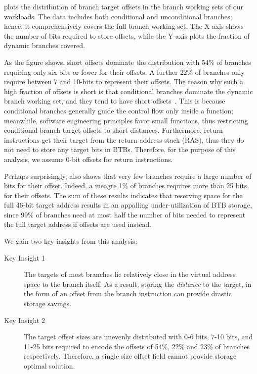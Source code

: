  plots the distribution of branch target offsets in the branch working sets of our workloads. The data includes both conditional and unconditional branches; hence, it comprehensively covers the full branch working set. The X-axis shows the number of bits required to store offsets, while the Y-axis plots the fraction of dynamic branches covered.

As the figure shows, short offsets dominate the distribution with 54\% of branches requiring only six bits or fewer for their offsets. A further 22\% of branches only require between 7 and 10-bits to represent their offsets. The reason why such a high fraction of offsets is short is that conditional branches dominate the dynamic branch working set, and they tend to have short offsets~\cite{boomerang}. This is because conditional branches generally guide the control flow only inside a function; meanwhile, software engineering principles favor small functions, thus restricting conditional branch target offsets to short distances. Furthermore, return instructions get their target from the return address stack (RAS), thus they do not need to store any target bits in BTBs. Therefore, for the purpose of this analysis, we assume 0-bit offsets for return instructions.

Perhaps surprisingly,  also shows that very few branches require a large number of bits for their offset. Indeed, a meagre 1\% of branches requires more than 25 bits for their offsets. The sum of these results indicates that reserving space for the full 46-bit target address results in an appalling under-utilization of BTB storage, since 99\% of branches need at most half the number of bits needed to represent the full target address if offsets are used instead.

We gain two key insights from this analysis:

\begin{description}
\item[Key Insight 1] The targets of most branches lie relatively close in the virtual address space to the branch itself. As a result, storing the {\em distance} to the target, in the form of an offset from the branch instruction can provide drastic storage savings. 

\item[Key Insight 2] The target offset sizes are unevenly distributed with 0-6 bits, 7-10 bits, and 11-25 bits required to encode the offsets of 54\%, 22\% and 23\% of branches respectively. Therefore, a single size offset field cannot provide storage optimal solution.
\end{description}

